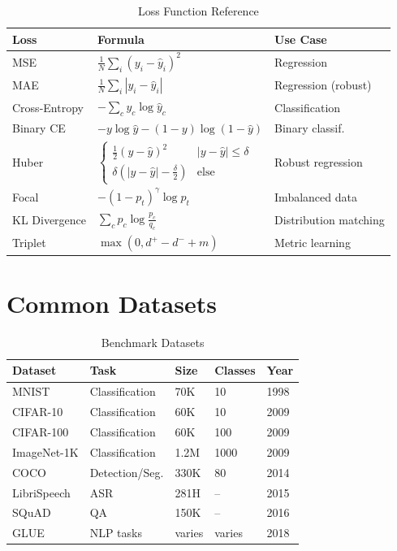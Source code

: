 \begin{table}[ht]
    \centering
    \caption{Loss Function Reference}
    \begin{tabular}{L{2.5cm} L{5cm} L{4.5cm}}
        \toprule
        \textbf{Loss} & \textbf{Formula} & \textbf{Use Case} \\
        \midrule
        MSE & $\frac{1}{N}\sum_{i}(y_i - \hat{y}_i)^2$ & Regression \\
        MAE & $\frac{1}{N}\sum_{i}|y_i - \hat{y}_i|$ & Regression (robust) \\
        Cross-Entropy & $-\sum_c y_c \log\hat{y}_c$ & Classification \\
        Binary CE & $-y\log\hat{y} - (1-y)\log(1-\hat{y})$ & Binary classif. \\
        Huber & $\begin{cases}\frac{1}{2}(y-\hat{y})^2 & |y-\hat{y}| \leq \delta \\ \delta(|y-\hat{y}|-\frac{\delta}{2}) & \text{else}\end{cases}$ & Robust regression \\
        Focal & $-(1-p_t)^\gamma \log p_t$ & Imbalanced data \\
        KL Divergence & $\sum_c p_c \log\frac{p_c}{q_c}$ & Distribution matching \\
        Triplet & $\max(0, d^+ - d^- + m)$ & Metric learning \\
        \bottomrule
    \end{tabular}
\end{table}

\section{Common Datasets}

\begin{table}[ht]
    \centering
    \caption{Benchmark Datasets}
    \begin{tabular}{L{2cm} L{2cm} L{2cm} L{3cm} L{2.5cm}}
        \toprule
        \textbf{Dataset} & \textbf{Task} & \textbf{Size} & \textbf{Classes} & \textbf{Year} \\
        \midrule
        MNIST & Classification & 70K & 10 & 1998 \\
        CIFAR-10 & Classification & 60K & 10 & 2009 \\
        CIFAR-100 & Classification & 60K & 100 & 2009 \\
        ImageNet-1K & Classification & 1.2M & 1000 & 2009 \\
        COCO & Detection/Seg. & 330K & 80 & 2014 \\
        LibriSpeech & ASR & 281H & -- & 2015 \\
        SQuAD & QA & 150K & -- & 2016 \\
        GLUE & NLP tasks & varies & varies & 2018 \\
        \bottomrule
    \end{tabular}
\end{table}

